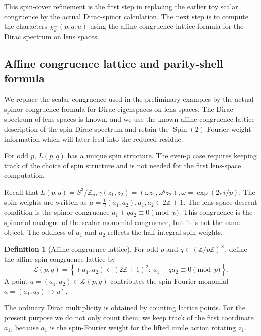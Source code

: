 \documentclass{article}
\theoremstyle{definition}
\newtheorem{definition}[theorem]{Definition}
\numberwithin{equation}{section}
\begin{document}
This spin-cover refinement is the first step in replacing the earlier toy scalar congruence by the actual Dirac-spinor calculation.  The next step is to compute the characters $\chi_k^\pm(p,q;u)$ using the affine congruence-lattice formula for the Dirac spectrum on lens spaces.

\subsection{Affine congruence lattice and parity-shell formula}
\label{subsec:stage-1B-affine-parity-shell}

We replace the scalar congruence used in the preliminary examples by the actual spinor congruence formula for Dirac eigenspaces on lens spaces.  The Dirac spectrum of lens spaces is known, and we use the known affine congruence-lattice description of the spin Dirac spectrum and retain the $\operatorname{Spin}(2)$-Fourier weight information which will later feed into the reduced residue.

For odd $p$, $L(p,q)$ has a unique spin structure.  The even-$p$ case requires keeping track of the choice of spin structure and is not needed for the first lens-space computation.

Recall that $L(p,q)=S^3/\mathbb Z_p, \gamma(z_1,z_2)=(\omega z_1,\omega^qz_2), \omega=\exp(2\pi i/p).$ The spin weights are written as $\mu=\frac12(a_1,a_2), a_1,a_2\in 2\mathbb Z+1.$ The lens-space descent condition is the spinor congruence $a_1+q a_2\equiv 0\pmod p.$ This congruence is the spinorial analogue of the scalar monomial congruence, but it is not the same object.  The oddness of $a_1$ and $a_2$ reflects the half-integral spin weights.

\begin{definition}[Affine congruence lattice]
For odd $p$ and $q\in(\mathbb Z/p\mathbb Z)^\times$, define the affine spin congruence lattice by
\begin{equation}
\mathcal L(p,q)=\left\{(a_1,a_2)\in(2\mathbb Z+1)^2:\ a_1+q a_2\equiv0\pmod p\right\}.
\end{equation}
A point $a=(a_1,a_2)\in\mathcal L(p,q)$ contributes the spin-Fourier monomial $a=(a_1,a_2)\longmapsto u^{a_1}.$ \end{definition}

The ordinary Dirac multiplicity is obtained by counting lattice points.  For the present purpose we do not only count them; we keep track of the first coordinate $a_1$, because $a_1$ is the spin-Fourier weight for the lifted circle action rotating $z_1$.
\end{document}
